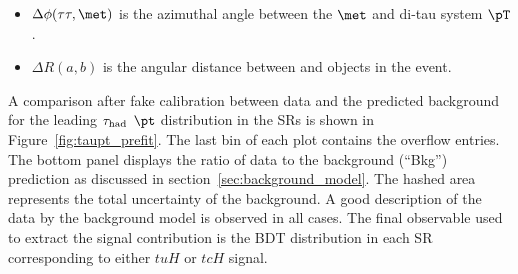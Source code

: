\begin{itemize}
\item $\Delta\phi(\tau\tau,\met)$ is the azimuthal angle between the $\met$ and di-tau system $\pT$.
\item $\Delta R(a,b)$ is the angular distance between  and  objects in the event. 
\end{itemize}

A comparison after fake calibration between data and the predicted background for the leading $\tau_{\mathrm{had}}$ $\pt$ distribution in the SRs 
is shown in Figure~\ref{fig:taupt_prefit}.
The last bin of each plot contains the overflow entries.
The bottom panel displays the ratio of data to the background (``Bkg'') prediction as discussed in section~\ref{sec:background_model}.
The hashed area represents the total uncertainty of the background.
A good description of the data by the background model is observed in all cases.
The final observable used to extract the signal contribution is the BDT distribution in each SR corresponding to either $tuH$ or $tcH$ signal.

